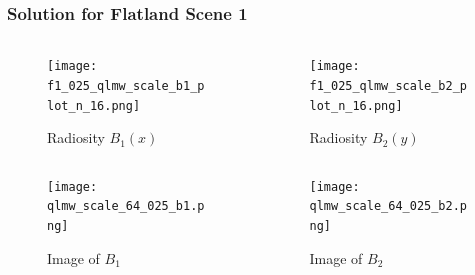     \begin{frame}\frametitle{Solution for Flatland Scene 1}
    \vspace{-7 mm}
        
        \begin{columns}[T]
          \begin{column}{.4\textwidth}
      
              \begin{figure}
              \centering
              \texttt{[image: f1\_025\_qlmw\_scale\_b1\_plot\_n\_16.png]}
              \vspace{-2 mm}
              \caption{Radiosity $B_1(x)$}
              \label{fig_gen_kernel_2D}
              \end{figure}
        \end{column}

        \begin{column}{.5\textwidth}
              \begin{figure}
              \centering
              \texttt{[image: f1\_025\_qlmw\_scale\_b2\_plot\_n\_16.png]}
              \vspace{-2 mm}
              \caption{Radiosity $B_2(y)$}
              \label{fig_gen_kernel_2D}
              \end{figure}
        \end{column}
      \end{columns}
        \begin{columns}[T]
          \begin{column}{.4\textwidth}
      
              \begin{figure}
              \centering
              \texttt{[image: qlmw\_scale\_64\_025\_b1.png]}
              \vspace{-2 mm}
              \caption{Image of $B_1$}
              \label{fig_gen_kernel_2D}
              \end{figure}
        \end{column}

        \begin{column}{.5\textwidth}

                \begin{figure}
              \centering
              \texttt{[image: qlmw\_scale\_64\_025\_b2.png]}
              \vspace{-2 mm}
              \caption{Image of $B_2$}
              \label{fig_gen_kernel_2D}
              \end{figure}
        \end{column}
      \end{columns}


    \end{frame}

